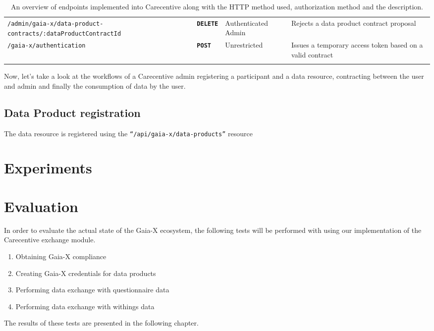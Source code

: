 \begin{longtable}{ |p{4cm}|p{2cm}|p{2cm}|p{7cm}| }
    \hhline{----}
    \texttt{/admin/gaia-x/data-product-contracts/:dataProductContractId} & \textbf{\texttt{DELETE}} & Authenticated Admin & Rejects a data product contract proposal\\
    \hhline{----}
    \texttt{/gaia-x/authentication} & \textbf{\texttt{POST}} & Unrestricted & Issues a temporary access token based on a valid contract\\
    \hhline{----}
    \caption{An overview of endpoints implemented into Carecentive along with the HTTP method used, authorization method and the description.}
    \label{tab:endpoints}
\end{longtable}

Now, let's take a look at the workflows of a Carecentive admin registering a participant and a data resource, contracting between the user and admin and finally the consumption of data by the user.

\subsection{Data Product registration}\label{subsec:data-product-registration}
The data resource is registered using the \texttt{``/api/gaia-x/data-products''} resource



\section{Experiments}\label{sec:experiments}



\section{Evaluation}\label{sec:evaluation}

In order to evaluate the actual state of the Gaia-X ecosystem, the following tests will be performed with using our implementation of the Carecentive exchange module.

\begin{enumerate}
    \item Obtaining Gaia-X compliance
    \item Creating Gaia-X credentials for data products
    \item Performing data exchange with questionnaire data
    \item Performing data exchange with withings data
\end{enumerate}

The results of these tests are presented in the following chapter.
